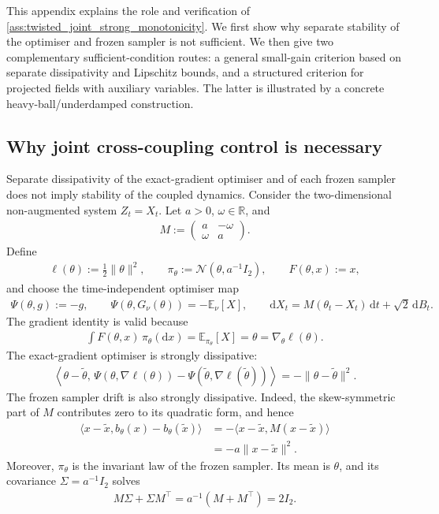 This appendix explains the role and verification of
\ref{ass:twisted_joint_strong_monotonicity}.  We first show why separate stability of the
optimiser and frozen sampler is not sufficient.  We then give two
complementary sufficient-condition routes: a general small-gain criterion
based on separate dissipativity and Lipschitz bounds, and a structured
criterion for projected fields with auxiliary variables.  The latter is
illustrated by a concrete heavy-ball/underdamped construction.

\subsection{Why joint cross-coupling control is necessary}
\label{app:cross_assumptions}

Separate dissipativity of the exact-gradient optimiser and of each frozen
sampler does not imply stability of the coupled dynamics.  Consider the
two-dimensional non-augmented system $Z_t=X_t$.  Let $a>0$,
$\omega\in\mathbb R$, and
\begin{align*}
M:=
\begin{pmatrix}
a&-\omega\\
\omega&a
\end{pmatrix}.
\end{align*}
Define
\begin{align*}
\ell(\theta):=\frac12\|\theta\|^2,
\qquad
\pi_\theta:=\mathcal N(\theta,a^{-1}I_2),
\qquad
F(\theta,x):=x,
\end{align*}
and choose the time-independent optimiser map
\begin{align*}
\Psi(\theta,g):=-g,
\qquad
\Psi(\theta,G_\nu(\theta))=-\mathbb E_\nu[X],
\qquad
\mathrm dX_t
=M(\theta_t-X_t)\,\mathrm dt+\sqrt2\,\mathrm dB_t.
\end{align*}
The gradient identity is valid because
\begin{align*}
\int F(\theta,x)\,\pi_\theta(\mathrm dx)
=\mathbb E_{\pi_\theta}[X]
=\theta
=\nabla_\theta\ell(\theta).
\end{align*}
The exact-gradient optimiser is strongly dissipative:
\begin{align*}
\left\langle
\theta-\tilde\theta,\,
\Psi(\theta,\nabla\ell(\theta))
-\Psi(\tilde\theta,\nabla\ell(\tilde\theta))
\right\rangle
=-\|\theta-\tilde\theta\|^2.
\end{align*}
The frozen sampler drift is also strongly dissipative.  Indeed, the
skew-symmetric part of $M$ contributes zero to its quadratic form, and hence
\begin{align*}
\langle x-\tilde x,b_\theta(x)-b_\theta(\tilde x)\rangle
&=-\langle x-\tilde x,M(x-\tilde x)\rangle\\
&=-a\|x-\tilde x\|^2.
\end{align*}
Moreover, $\pi_\theta$ is the invariant law of the frozen sampler.  Its mean
is $\theta$, and its covariance $\Sigma=a^{-1}I_2$ solves
\begin{align*}
M\Sigma+\Sigma M^\top
=a^{-1}(M+M^\top)
=2I_2.
\end{align*}

